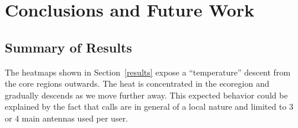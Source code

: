 %
%


\section{Conclusions and Future Work}

\subsection{Summary of Results}

The heatmaps shown in Section~\ref{results} expose a ``temperature'' descent from the core regions outwards. The heat is concentrated in the ecoregion and gradually descends as we move further away. This expected behavior could be explained by the fact that calls are in general of a local nature and limited to 3 or 4 main antennas used per user. 

